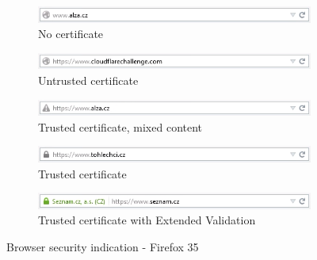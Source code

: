 \begin{figure}
  \begin{subfigure}[b]{\textwidth}
    \centering
    \includegraphics[scale=0.6]{images/browsers/ff-none.png}
    \caption{No certificate}
  \end{subfigure}
  \begin{subfigure}[b]{\textwidth}
    \centering
    \includegraphics[scale=0.6]{images/browsers/ff-untrusted.png}
    \caption{Untrusted certificate}
  \end{subfigure}
  \begin{subfigure}[b]{\textwidth}
    \centering
    \includegraphics[scale=0.6]{images/browsers/ff-mixed.png}
    \caption{Trusted certificate, mixed content}
  \end{subfigure}
  \begin{subfigure}[b]{\textwidth}
    \centering
    \includegraphics[scale=0.6]{images/browsers/ff-dv.png}
    \caption{Trusted certificate}
  \end{subfigure}
  \begin{subfigure}[b]{\textwidth}
    \centering
    \includegraphics[scale=0.6]{images/browsers/ff-ev.png}
    \caption{Trusted certificate with Extended Validation}
  \end{subfigure}
  \caption{Browser security indication - Firefox 35}
\end{figure}


